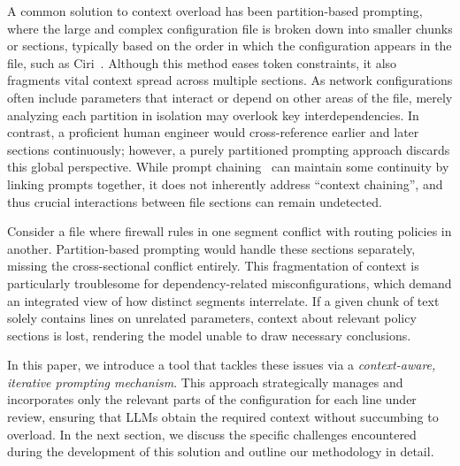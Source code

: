 A common solution to context overload has been partition-based prompting,
where the large and complex configuration file is broken down into smaller
chunks or sections, typically based on the order in which the configuration
appears in the file, such as Ciri~\cite{lian2023configuration}. 
 Although this method eases token constraints, it also fragments
vital context spread across multiple sections. As network configurations often include
parameters that interact or depend on other areas of the file, merely analyzing each
partition in isolation may overlook key interdependencies. In contrast, a proficient
human engineer would cross-reference earlier and later sections continuously; however,
a purely partitioned prompting approach discards this global perspective. While prompt
chaining~\cite{wang2024identifying,bogdanov2024leveraging} can maintain some continuity
by linking prompts together, it does not inherently address “context chaining”, and
thus crucial interactions between file sections can remain undetected.

Consider a file where firewall rules in one segment conflict with routing policies
in another. Partition-based prompting would handle these sections separately, missing
the cross-sectional conflict entirely. This fragmentation of context is particularly
troublesome for dependency-related misconfigurations, which demand an integrated view
of how distinct segments interrelate. If a given chunk of text solely contains lines
on unrelated parameters, context about relevant policy sections is lost, rendering
the model unable to draw necessary conclusions.

In this paper, we introduce a tool that tackles these issues via a \emph{context-aware,
	iterative prompting mechanism}. This approach strategically manages and incorporates
only the relevant parts of the configuration for each line under review, ensuring that
LLMs obtain the required context without succumbing to overload. In the next section,
we discuss the specific challenges encountered during the development of this solution
and outline our methodology in detail.

